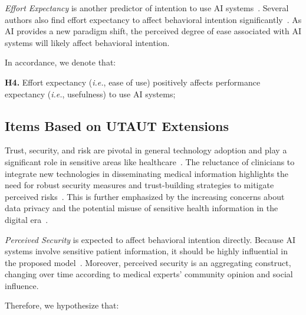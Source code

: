 \vspace{2.00mm}

{\it Effort Expectancy} is another predictor of intention to use \ac{AI} systems~\cite{CALISTO2022102922}.
Several authors also find effort expectancy to affect behavioral intention significantly~\cite{KHALILZADEH2017460, HART201993}.
As \ac{AI} provides a new paradigm shift, the perceived degree of ease associated with \ac{AI} systems will likely affect behavioral intention.


\noindent
In accordance, we denote that:

\vspace{2.00mm}

\noindent
{\bf H4.} Effort expectancy ({\it i.e.}, ease of use) positively affects performance expectancy ({\it i.e.}, usefulness) to use \ac{AI} systems;


\subsection{Items Based on UTAUT Extensions}
\label{sec:chap004003002}

Trust, security, and risk are pivotal in general technology adoption and play a significant role in sensitive areas like healthcare~\cite{KHALILZADEH2017460}.
The reluctance of clinicians to integrate new technologies in disseminating medical information highlights the need for robust security measures and trust-building strategies to mitigate perceived risks~\cite{10.1145/3132272.3134111}.
This is further emphasized by the increasing concerns about data privacy and the potential misuse of sensitive health information in the digital era~\cite{CALISTO2022102922}.

\vspace{2.00mm}

{\it Perceived Security} is expected to affect behavioral intention directly.
Because \ac{AI} systems involve sensitive patient information, it should be highly influential in the proposed model~\cite{KHALILZADEH2017460}.
Moreover, perceived security is an aggregating construct, changing over time according to medical experts' community opinion and social influence.

\vspace{2.00mm}

\noindent
Therefore, we hypothesize that:


